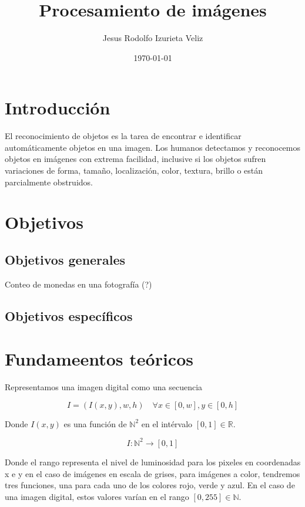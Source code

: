 \documentclass[letter]{article}
\author{Jesus Rodolfo Izurieta Veliz}
\date{\today}
\title{Procesamiento de imágenes}
\begin{document}
\maketitle

\section{Introducción}
\label{sec:orgd9ecb52}
El reconocimiento de objetos es la tarea de encontrar e identificar
automáticamente objetos en una imagen. Los humanos detectamos y reconocemos
objetos en imágenes con extrema facilidad, inclusive si los objetos sufren
variaciones de forma, tamaño, localización, color, textura, brillo o están
parcialmente obstruidos.

\section{Objetivos}
\label{sec:org135b074}
\subsection{Objetivos generales}
\label{sec:org4a1ed3a}
Conteo de monedas en una fotografía (?)

\subsection{Objetivos específicos}
\label{sec:orge8f6ca1}

\section{Fundameentos teóricos}
\label{sec:org52b8a44}
Representamos una imagen digital como una secuencia

\begin{equation}
I = (I(x, y), w, h)\quad \forall x \in [0, w], y \in [0, h]
\end{equation}

Donde \(I(x, y)\) es una función de \(\mathbb N^2\) en el intérvalo \([0,1]\in \mathbb R\).

$$
I:\mathbb N^2 \rightarrow [0, 1]
$$

Donde el rango representa el nivel de luminosidad para los pixeles en
coordenadas x e y en el caso de imágenes en escala de grises, para imágenes a
color, tendremos tres funciones, una para cada uno de los colores rojo, verde y
azul. En el caso de una imagen digital, estos valores varían en el rango
\([0,255]\in \mathbb N\).
\end{document}
